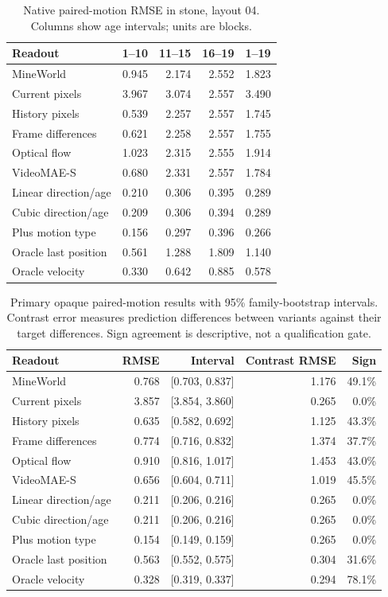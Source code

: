 \begin{table}[!htbp]
\centering\small
\caption{Native paired-motion RMSE in stone, layout 04. Columns show age intervals; units are blocks.}
\label{tab:motion-L4-layout_04}
\begin{tabular}{@{}lrrrr@{}}
\toprule
Readout & 1--10 & 11--15 & 16--19 & 1--19\\
\midrule
MineWorld & 0.945 & 2.174 & 2.552 & 1.823\\
Current pixels & 3.967 & 3.074 & 2.557 & 3.490\\
History pixels & 0.539 & 2.257 & 2.557 & 1.745\\
Frame differences & 0.621 & 2.258 & 2.557 & 1.755\\
Optical flow & 1.023 & 2.315 & 2.555 & 1.914\\
VideoMAE-S & 0.680 & 2.331 & 2.557 & 1.784\\
Linear direction/age & 0.210 & 0.306 & 0.395 & 0.289\\
Cubic direction/age & 0.209 & 0.306 & 0.394 & 0.289\\
Plus motion type & 0.156 & 0.297 & 0.396 & 0.266\\
Oracle last position & 0.561 & 1.288 & 1.809 & 1.140\\
Oracle velocity & 0.330 & 0.642 & 0.885 & 0.578\\
\bottomrule
\end{tabular}
\end{table}

\clearpage
\begin{table}[!htbp]
\centering\small
\caption{Primary opaque paired-motion results with 95\% family-bootstrap intervals. Contrast error measures prediction differences between variants against their target differences. Sign agreement is descriptive, not a qualification gate.}
\label{tab:motion-contrasts}
\begin{tabular}{@{}lrrrr@{}}
\toprule
Readout & RMSE & Interval & Contrast RMSE & Sign\\
\midrule
MineWorld & 0.768 & [0.703, 0.837] & 1.176 & 49.1\%\\
Current pixels & 3.857 & [3.854, 3.860] & 0.265 & 0.0\%\\
History pixels & 0.635 & [0.582, 0.692] & 1.125 & 43.3\%\\
Frame differences & 0.774 & [0.716, 0.832] & 1.374 & 37.7\%\\
Optical flow & 0.910 & [0.816, 1.017] & 1.453 & 43.0\%\\
VideoMAE-S & 0.656 & [0.604, 0.711] & 1.019 & 45.5\%\\
Linear direction/age & 0.211 & [0.206, 0.216] & 0.265 & 0.0\%\\
Cubic direction/age & 0.211 & [0.206, 0.216] & 0.265 & 0.0\%\\
Plus motion type & 0.154 & [0.149, 0.159] & 0.265 & 0.0\%\\
Oracle last position & 0.563 & [0.552, 0.575] & 0.304 & 31.6\%\\
Oracle velocity & 0.328 & [0.319, 0.337] & 0.294 & 78.1\%\\
\bottomrule
\end{tabular}
\end{table}

